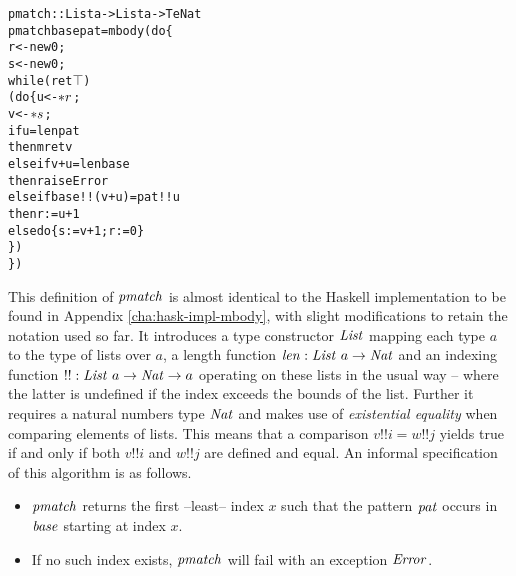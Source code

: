 \begin{alltt}
pmatch :: List a -> List a -> T e Nat
pmatch base pat = mbody ( do \{
    r <- new 0;
    s <- new 0;
    while (ret \(\top\))
          (do \{ u <- \(\rd{r}\);
                v <- \(\rd{s}\);
                if u = len pat
                  then mret v
                  else if v + u = len base 
                    then raise Error
                    else if base!!(v+u) = pat!!u
                      then r := u+1
                      else do \{ s := v+1; r := 0 \}
              \})
    \})
\end{alltt}
                  
This definition of $\mathit{pmatch}$ is almost identical to the Haskell
implementation to be found in Appendix \ref{cha:hask-impl-mbody}, with slight
modifications to retain the notation used so far. It introduces a type
constructor $\mathit{List}$ mapping each type $a$ to the type of lists over $a$, a
length function $\mathit{len} : \mathit{List}\ a \to \mathit{Nat}$ and an indexing function
$!! : \mathit{List}\ a \to \mathit{Nat} \to a$ operating on these lists in the usual way --
where the latter is undefined if the index exceeds the bounds of the list.
Further it requires a natural numbers type $\mathit{Nat}$ and makes use of
\emph{existential equality} when comparing elements of lists.  This means that a
comparison $v!!i = w!!j$ yields true if and only if both $v!!i$ and $w!!j$ are
defined and equal. An informal specification of this algorithm is as follows.
\begin{itemize}
\item $\mathit{pmatch}$ returns the first --\IE least-- index $x$ such that the
  pattern $\mathit{pat}$ occurs in $\mathit{base}$ starting at index $x$.
\item If no such index exists, $\mathit{pmatch}$ will fail with an exception
  $\mathit{Error}$.
\end{itemize}


